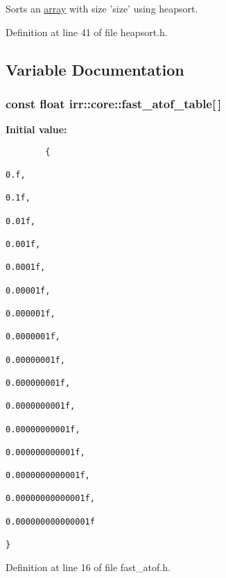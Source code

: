 Sorts an \hyperlink{classirr_1_1core_1_1array}{array} with size 'size' using heapsort. 



Definition at line 41 of file heapsort.h.

\subsection{Variable Documentation}
\hypertarget{namespaceirr_1_1core_92c5412fe484f856839d848f0b5e3aba}{
\subsubsection[{fast\_\-atof\_\-table}]{\setlength{\rightskip}{0pt plus 5cm}const float {\bf irr::core::fast\_\-atof\_\-table}\mbox{[}$\,$\mbox{]}}}
\label{namespaceirr_1_1core_92c5412fe484f856839d848f0b5e3aba}


\textbf{Initial value:}

\begin{Code}\begin{verbatim}        {
                                                                                0.f,
                                                                                0.1f,
                                                                                0.01f,
                                                                                0.001f,
                                                                                0.0001f,
                                                                                0.00001f,
                                                                                0.000001f,
                                                                                0.0000001f,
                                                                                0.00000001f,
                                                                                0.000000001f,
                                                                                0.0000000001f,
                                                                                0.00000000001f,
                                                                                0.000000000001f,
                                                                                0.0000000000001f,
                                                                                0.00000000000001f,
                                                                                0.000000000000001f
                                                                        }
\end{verbatim}
\end{Code}


Definition at line 16 of file fast\_\-atof.h.